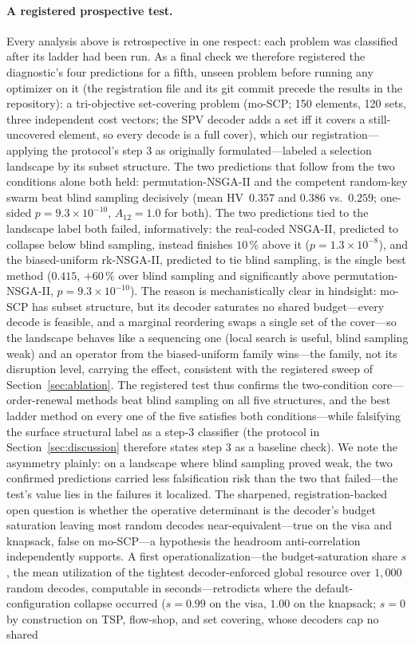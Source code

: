 \documentclass[runningheads]{llncs}
\newcommand{\HV}{\textsf{HV}}
\begin{document}
\paragraph{A registered prospective test.}
Every analysis above is retrospective in one respect: each problem was classified after its ladder had been run. As a final check we therefore registered the diagnostic's four predictions for a fifth, unseen problem before running any optimizer on it (the registration file and its git commit precede the results in the repository): a tri-objective set-covering problem (mo-SCP; 150 elements, 120 sets, three independent cost vectors; the SPV decoder adds a set iff it covers a still-uncovered element, so every decode is a full cover), which our registration---applying the protocol's step 3 as originally formulated---labeled a selection landscape by its subset structure. The two predictions that follow from the two conditions alone both held: permutation-NSGA-II and the competent random-key swarm beat blind sampling decisively (mean \HV\ $0.357$ and $0.386$ vs.\ $0.259$; one-sided $p=9.3\times10^{-10}$, $A_{12}=1.0$ for both). The two predictions tied to the landscape label both failed, informatively: the real-coded NSGA-II, predicted to collapse below blind sampling, instead finishes $10\,\%$ above it ($p=1.3\times10^{-8}$), and the biased-uniform rk-NSGA-II, predicted to tie blind sampling, is the single best method ($0.415$, $+60\,\%$ over blind sampling and significantly above permutation-NSGA-II, $p=9.3\times10^{-10}$). The reason is mechanistically clear in hindsight: mo-SCP has subset structure, but its decoder saturates no shared budget---every decode is feasible, and a marginal reordering swaps a single set of the cover---so the landscape behaves like a sequencing one (local search is useful, blind sampling weak) and an operator from the biased-uniform family wins---the family, not its disruption level, carrying the effect, consistent with the registered sweep of Section~\ref{sec:ablation}. The registered test thus confirms the two-condition core---order-renewal methods beat blind sampling on all five structures, and the best ladder method on every one of the five satisfies both conditions---while falsifying the surface structural label as a step-3 classifier (the protocol in Section~\ref{sec:discussion} therefore states step 3 as a baseline check). We note the asymmetry plainly: on a landscape where blind sampling proved weak, the two confirmed predictions carried less falsification risk than the two that failed---the test's value lies in the failures it localized. The sharpened, registration-backed open question is whether the operative determinant is the decoder's budget saturation leaving most random decodes near-equivalent---true on the visa and knapsack, false on mo-SCP---a hypothesis the headroom anti-correlation independently supports. A first operationalization---the budget-saturation share $s$, the mean utilization of the tightest decoder-enforced global resource over $1{,}000$ random decodes, computable in seconds---retrodicts where the default-configuration collapse occurred ($s=0.99$ on the visa, $1.00$ on the knapsack; $s=0$ by construction on TSP, flow-shop, and set covering, whose decoders cap no shared 
\end{document}
